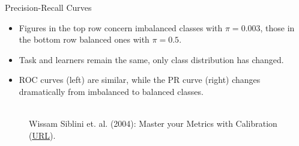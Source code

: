 \begin{vbframe}{Precision-Recall Curves}
\begin{footnotesize}
\vspace{-0.2cm}
\begin{itemize}
  \item Figures in the top row concern imbalanced classes with $\pi = 0.003$,
  those in the bottom row balanced ones with $\pi = 0.5$.
  \item Task and learners remain the same, only class distribution has changed.
  \item ROC curves (left) are similar, while the PR curve (right) changes
  dramatically from imbalanced to balanced classes.
\end{itemize}

\end{footnotesize}


\begin{figure}
  \centering
  \tiny
  \\ Wissam Siblini et. al. (2004): Master your Metrics with Calibration
  (\href{https://arxiv.org/pdf/1909.02827.pdf}{\underline{URL}}).
\end{figure}


\end{vbframe}
